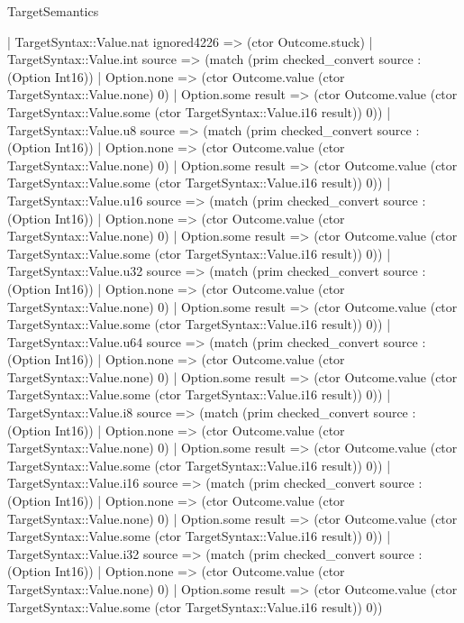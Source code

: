\begin{lexlean}{TargetSemantics}
\begin{semanticmodule}
{            | TargetSyntax::Value.nat ignored4226 => (ctor Outcome.stuck)
            | TargetSyntax::Value.int source => (match (prim checked_convert source : (Option Int16))
              | Option.none => (ctor Outcome.value (ctor TargetSyntax::Value.none) 0)
              | Option.some result => (ctor Outcome.value (ctor TargetSyntax::Value.some (ctor TargetSyntax::Value.i16 result)) 0))
            | TargetSyntax::Value.u8 source => (match (prim checked_convert source : (Option Int16))
              | Option.none => (ctor Outcome.value (ctor TargetSyntax::Value.none) 0)
              | Option.some result => (ctor Outcome.value (ctor TargetSyntax::Value.some (ctor TargetSyntax::Value.i16 result)) 0))
            | TargetSyntax::Value.u16 source => (match (prim checked_convert source : (Option Int16))
              | Option.none => (ctor Outcome.value (ctor TargetSyntax::Value.none) 0)
              | Option.some result => (ctor Outcome.value (ctor TargetSyntax::Value.some (ctor TargetSyntax::Value.i16 result)) 0))
            | TargetSyntax::Value.u32 source => (match (prim checked_convert source : (Option Int16))
              | Option.none => (ctor Outcome.value (ctor TargetSyntax::Value.none) 0)
              | Option.some result => (ctor Outcome.value (ctor TargetSyntax::Value.some (ctor TargetSyntax::Value.i16 result)) 0))
            | TargetSyntax::Value.u64 source => (match (prim checked_convert source : (Option Int16))
              | Option.none => (ctor Outcome.value (ctor TargetSyntax::Value.none) 0)
              | Option.some result => (ctor Outcome.value (ctor TargetSyntax::Value.some (ctor TargetSyntax::Value.i16 result)) 0))
            | TargetSyntax::Value.i8 source => (match (prim checked_convert source : (Option Int16))
              | Option.none => (ctor Outcome.value (ctor TargetSyntax::Value.none) 0)
              | Option.some result => (ctor Outcome.value (ctor TargetSyntax::Value.some (ctor TargetSyntax::Value.i16 result)) 0))
            | TargetSyntax::Value.i16 source => (match (prim checked_convert source : (Option Int16))
              | Option.none => (ctor Outcome.value (ctor TargetSyntax::Value.none) 0)
              | Option.some result => (ctor Outcome.value (ctor TargetSyntax::Value.some (ctor TargetSyntax::Value.i16 result)) 0))
            | TargetSyntax::Value.i32 source => (match (prim checked_convert source : (Option Int16))
              | Option.none => (ctor Outcome.value (ctor TargetSyntax::Value.none) 0)
              | Option.some result => (ctor Outcome.value (ctor TargetSyntax::Value.some (ctor TargetSyntax::Value.i16 result)) 0))
}
\end{semanticmodule}
\end{lexlean}
